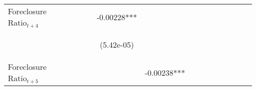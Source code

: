\begin{table}
\begin{center}
{\begin{tabular}{lccccccccccccc}
Foreclosure Ratio$_{t+4}$    &  &  &  & -0.00228*** &  &  &  &  &  &  &  &  \\
\vspace{4pt}  & \begin{footnotesize}\end{footnotesize} & \begin{footnotesize}\end{footnotesize} & \begin{footnotesize}\end{footnotesize} & \begin{footnotesize}(5.42e-05)\end{footnotesize} & \begin{footnotesize}\end{footnotesize} & \begin{footnotesize}\end{footnotesize} & \begin{footnotesize}\end{footnotesize} & \begin{footnotesize}\end{footnotesize} & \begin{footnotesize}\end{footnotesize} & \begin{footnotesize}\end{footnotesize} & \begin{footnotesize}\end{footnotesize} & \begin{footnotesize}\end{footnotesize} \\
Foreclosure Ratio$_{t+5}$ &   &  &  &  & -0.00238*** &  &  &  &  &  &  &  \\

\end{tabular}}
\end{center}
\end{table}
